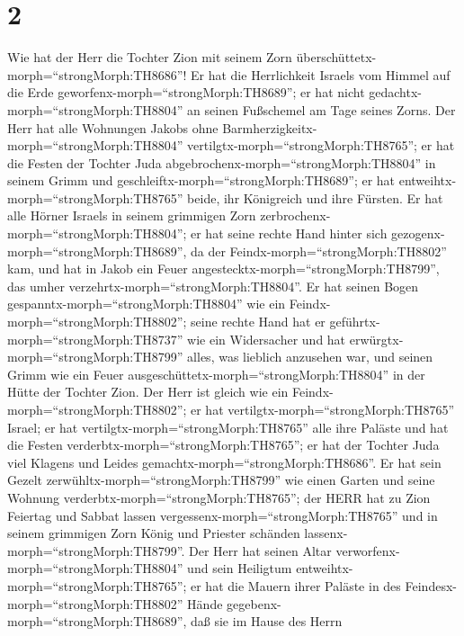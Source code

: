 \hypertarget{section-1}{%
\section{2}\label{section-1}}

 Wie hat der Herr die Tochter Zion mit seinem Zorn
überschüttetx-morph=``strongMorph:TH8686''! Er hat die Herrlichkeit
Israels vom Himmel auf die Erde geworfenx-morph=``strongMorph:TH8689'';
er hat nicht gedachtx-morph=``strongMorph:TH8804'' an seinen Fußschemel
am Tage seines Zorns.  Der Herr hat alle Wohnungen Jakobs
ohne Barmherzigkeitx-morph=``strongMorph:TH8804''
vertilgtx-morph=``strongMorph:TH8765''; er hat die Festen der Tochter
Juda abgebrochenx-morph=``strongMorph:TH8804'' in seinem Grimm und
geschleiftx-morph=``strongMorph:TH8689''; er hat
entweihtx-morph=``strongMorph:TH8765'' beide, ihr Königreich und ihre
Fürsten.  Er hat alle Hörner Israels in seinem grimmigen
Zorn zerbrochenx-morph=``strongMorph:TH8804''; er hat seine rechte Hand
hinter sich gezogenx-morph=``strongMorph:TH8689'', da der
Feindx-morph=``strongMorph:TH8802'' kam, und hat in Jakob ein Feuer
angestecktx-morph=``strongMorph:TH8799'', das umher
verzehrtx-morph=``strongMorph:TH8804''.  Er hat seinen Bogen
gespanntx-morph=``strongMorph:TH8804'' wie ein
Feindx-morph=``strongMorph:TH8802''; seine rechte Hand hat er
geführtx-morph=``strongMorph:TH8737'' wie ein Widersacher und hat
erwürgtx-morph=``strongMorph:TH8799'' alles, was lieblich anzusehen war,
und seinen Grimm wie ein Feuer
ausgeschüttetx-morph=``strongMorph:TH8804'' in der Hütte der Tochter
Zion.  Der Herr ist gleich wie ein
Feindx-morph=``strongMorph:TH8802''; er hat
vertilgtx-morph=``strongMorph:TH8765'' Israel; er hat
vertilgtx-morph=``strongMorph:TH8765'' alle ihre Paläste und hat die
Festen verderbtx-morph=``strongMorph:TH8765''; er hat der Tochter Juda
viel Klagens und Leides gemachtx-morph=``strongMorph:TH8686''.
 Er hat sein Gezelt zerwühltx-morph=``strongMorph:TH8799''
wie einen Garten und seine Wohnung
verderbtx-morph=``strongMorph:TH8765''; der HERR hat zu Zion Feiertag
und Sabbat lassen vergessenx-morph=``strongMorph:TH8765'' und in seinem
grimmigen Zorn König und Priester schänden
lassenx-morph=``strongMorph:TH8799''.  Der Herr hat seinen
Altar verworfenx-morph=``strongMorph:TH8804'' und sein Heiligtum
entweihtx-morph=``strongMorph:TH8765''; er hat die Mauern ihrer Paläste
in des Feindesx-morph=``strongMorph:TH8802'' Hände
gegebenx-morph=``strongMorph:TH8689'', daß sie im Hause des Herrn
